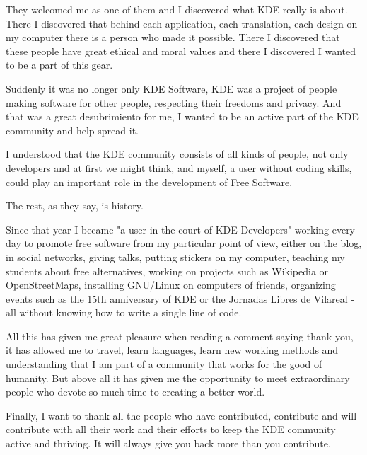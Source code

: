 They welcomed me as one of them and I discovered what KDE really is about. There I discovered that behind each application, each translation, each design on my computer there is a person who made it possible. There I discovered that these people have great ethical and moral values and there I discovered I wanted to be a part of this gear.

Suddenly it was no longer only KDE Software, KDE was a project of people making software for other people, respecting their freedoms and privacy. And that was a great desubrimiento for me, I wanted to be an active part of the KDE community and help spread it.

I understood that the KDE community consists of all kinds of people, not only developers and at first we might think, and myself, a user without coding skills, could play an important role in the development of Free Software.

The rest, as they say, is history.

Since that year I became "a user in the court of KDE Developers" working every day to promote free software from my particular point of view, either on the blog, in social networks, giving talks, putting stickers on my computer, teaching my students about free alternatives, working on projects such as Wikipedia or OpenStreetMaps, installing GNU/Linux on computers of friends, organizing events such as the 15th anniversary of KDE or the Jornadas Libres de Vila­real - all without knowing how to write a single line of code.

All this has given me great pleasure when reading a comment saying thank you, it has allowed me to travel, learn languages, learn new working methods and understanding that I am part of a community that works for the good of humanity. But above all it has given me the opportunity to meet extraordinary people who devote so much time to creating a better world.

Finally, I want to thank all the people who have contributed, contribute and will contribute with all their work and their efforts to keep the KDE community active and thriving. It will always give you back more than you contribute.
